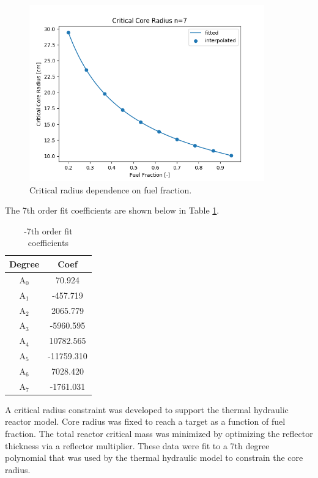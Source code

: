 \begin{figure}[h]
    \centering
    \includegraphics[width=4in]{../images/uo2_co2_core_r.png}
\caption{Critical radius dependence on fuel fraction.}
\label{fig:core_r_co2_uo2}
\end{figure}

The 7th order fit coefficients are shown below in Table
\ref{tab:uo2_co2_fit_coeffs}.

\begin{table}[h]
  \centering
  \caption{\uox-\codiox 7th order fit coefficients}
  \begin{tabular}{cc}
    \toprule
     Degree & Coef\\ 
    \midrule                                  
    A$_0$  &  70.924\\
    A$_1$  &  -457.719\\
    A$_2$  &  2065.779\\
    A$_3$  &  -5960.595\\
    A$_4$  &  10782.565\\
    A$_5$  &  -11759.310\\
    A$_6$  &  7028.420\\
    A$_7$  &  -1761.031\\
  \end{tabular}
  \label{tab:uo2_co2_fit_coeffs}
\end{table}

A critical radius constraint was developed to support the thermal hydraulic
reactor model. Core radius was fixed to reach a target \keff as a function of
fuel fraction. The total reactor critical mass was minimized by optimizing the
reflector thickness via a reflector multiplier. These data were fit to a 7th
degree polynomial that was used by the thermal hydraulic model to constrain the
core radius.
